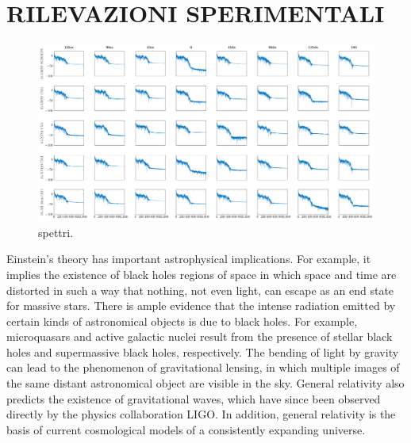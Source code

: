\clearpage
\section*{RILEVAZIONI SPERIMENTALI}

%

\begin{figure}[t]
\centering
\includegraphics[width=.97\textwidth]{img/statistiche/pdf/spectra}
\caption{spettri.}
\label{spettri}
\end{figure}

Einstein's theory has important astrophysical implications. For example, it
implies the existence of black holes regions of space in which space and time
are distorted in such a way that nothing, not even light, can escape as an
end state for massive stars. There is ample evidence that the intense radiation
emitted by certain kinds of astronomical objects is due to black holes. For
example, microquasars and active galactic nuclei result from the presence of
stellar black holes and supermassive black holes, respectively. The bending of
light by gravity can lead to the phenomenon of gravitational lensing, in which
multiple images of the same distant astronomical object are visible in the sky.
General relativity also predicts the existence of gravitational waves, which
have since been observed directly by the physics collaboration LIGO. In addition,
general relativity is the basis of current cosmological models of a consistently
expanding universe.

\vfill\null

\raggedright





